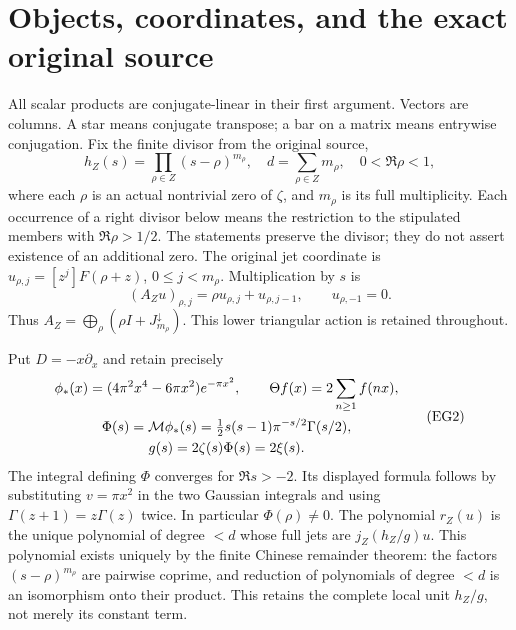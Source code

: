 \section{Objects, coordinates, and the exact original source}\label{eg:sec:objects}
All scalar products are conjugate-linear in their first argument. Vectors
are columns. A star means conjugate transpose; a bar on a matrix means
entrywise conjugation. Fix the finite divisor from the original source,
\[
 h_Z(s)=\prod_{\rho\in Z}(s-\rho)^{m_\rho},\quad
 d=\sum_{\rho\in Z}m_\rho,\quad 0<\Re\rho<1,
\]
where each $\rho$ is an actual nontrivial zero of $\zeta$, and $m_\rho$
is its full multiplicity. Each occurrence of a right divisor below means
the restriction to the stipulated members with $\Re\rho>1/2$. The
statements preserve the divisor; they do not assert existence of an
additional zero. The original jet coordinate is
$u_{\rho,j}=[z^j]F(\rho+z)$, $0\le j<m_\rho$. Multiplication by $s$ is
\[
 (A_Zu)_{\rho,j}=\rho u_{\rho,j}+u_{\rho,j-1},\qquad u_{\rho,-1}=0.
 \tag{EG1}\label{eg:eq:jet-action}
\]
Thus $A_Z=\bigoplus_\rho(\rho I+J^\downarrow_{m_\rho})$.
This lower triangular action is retained throughout.

Put $D=-x\partial_x$ and retain precisely
\[
 \begin{gathered}
 \phi_*(x)=(4\pi^2x^4-6\pi x^2)e^{-\pi x^2},\qquad
 \Theta f(x)=2\sum_{n\ge1}f(nx),\\
 \Phi(s)=\mathcal M\phi_*(s)=\tfrac12s(s-1)\pi^{-s/2}\Gamma(s/2),\\
 g(s)=2\zeta(s)\Phi(s)=2\xi(s).
 \end{gathered}
 \tag{EG2}\label{eg:eq:source}
\]
The integral defining $\Phi$ converges for $\Re s>-2$. Its displayed
formula follows by substituting $v=\pi x^2$ in the two Gaussian
integrals and using $\Gamma(z+1)=z\Gamma(z)$ twice. In particular
$\Phi(\rho)\ne0$. The polynomial $r_Z(u)$ is the unique polynomial of
degree $<d$ whose full jets are $j_Z(h_Z/g)u$. This polynomial exists
uniquely by the finite Chinese remainder theorem: the factors
$(s-\rho)^{m_\rho}$ are pairwise coprime, and reduction of polynomials
of degree $<d$ is an isomorphism onto their product. This retains the
complete local unit $h_Z/g$, not merely its constant term.

